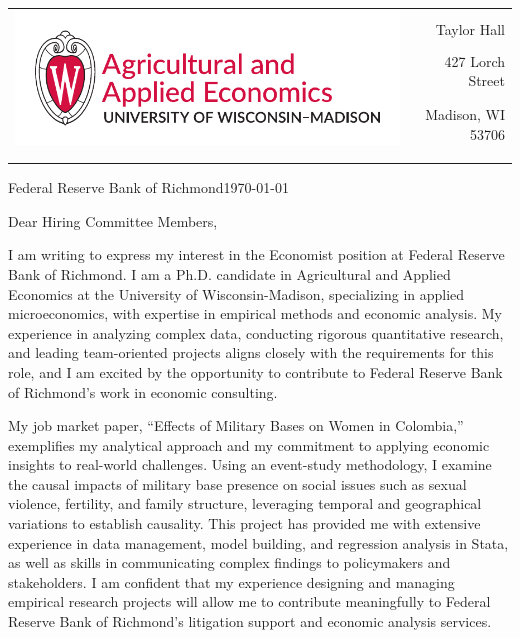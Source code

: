 \documentclass[12pt]{letter}
\begin{document}
\begin{tabularx}{\textwidth}{Xr}
\multirow{4}{*}{\includegraphics[height=3\baselineskip]{logo_cropped.pdf}} &  \\
& Taylor Hall \\
& 427 Lorch Street \\
& Madison, WI 53706 \\
[-1.8ex]\\
\\
\end{tabularx}

\newcommand{\compName}{Federal Reserve Bank of Richmond}
\newcommand{\posName}{Economist}

\compName \hfill \today \\

\medskip

Dear Hiring Committee Members,

I am writing to express my interest in the \posName \vspace{1mm} position at \compName. 
I am a Ph.D. candidate in Agricultural and Applied Economics at the University of Wisconsin-Madison, specializing in applied microeconomics, 
with expertise in empirical methods and economic analysis. My experience in analyzing complex data, conducting rigorous quantitative research, 
and leading team-oriented projects aligns closely with the requirements for this role, and I am excited by the opportunity to contribute 
to \compName's work in economic consulting.

My job market paper, “Effects of Military Bases on Women in Colombia,” exemplifies my analytical approach and my commitment to 
applying economic insights to real-world challenges. Using an event-study methodology, I examine the causal impacts of military base presence 
on social issues such as sexual violence, fertility, and family structure, leveraging temporal and geographical variations to establish causality. 
This project has provided me with extensive experience in data management, model building, and regression analysis in Stata, as well as skills 
in communicating complex findings to policymakers and stakeholders. I am confident that my experience designing and managing empirical research projects 
will allow me to contribute meaningfully to \compName's litigation support and economic analysis services.
\end{document}
